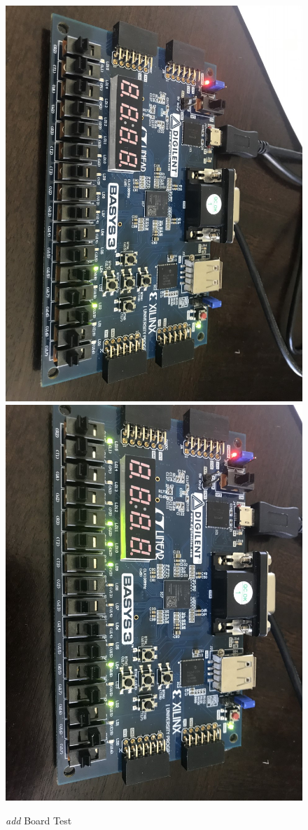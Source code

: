 \documentclass[11pt]{article}
\begin{document}
\begin{figure}[ht]\centering
	\includegraphics[angle=90, width=.8\textwidth]{add1}
	\includegraphics[angle=90, width=.8\textwidth]{add2}
	\caption{\textit{add} Board Test}
	\label{fig:sim_with_table}
\end{figure}
\end{document}
